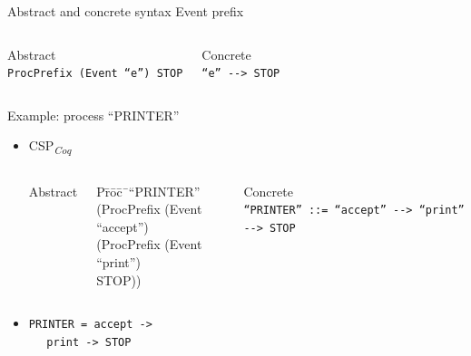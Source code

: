 \documentclass[t]{beamer}
\newcommand{\CSPcoq}{CSP\textsubscript{\textit{Coq}}}
\begin{document}
\begin{frame}{Abstract and concrete syntax}
	Event prefix
	\vskip 0.1in
	\begin{columns}
		\centering\small
		Abstract\\
		\texttt{ProcPrefix (Event ``e'') STOP}

		\centering\small
		Concrete\\
		\texttt{``e'' -{}-> STOP}
	\end{columns}

	\vskip 0.25in
	Example: process ``PRINTER''
	\begin{itemize}
		\item \CSPcoq{}\\
		\vskip 0.1in
		\begin{columns}
			\column{0.5\textwidth}
			\centering\small
			Abstract\\
			\ttfamily
			\begin{tabbing}
				P\=r\=o\=c\=\ ``PRINTER''\\
				\>	(ProcPrefix (Event ``accept'')\\
				\>\>	(ProcPrefix (Event ``print'')\\
				\>\>\>		STOP))
			\end{tabbing}
			\normalfont

			\column{0.5\textwidth}
			\centering\small
			Concrete\\
			\texttt{``PRINTER'' ::= ``accept'' -{}-> ``print'' -{}-> STOP}
		\end{columns}
		\vspace{1mm}
		\item \CSPM{}
		\vskip 0.05in
		\texttt{PRINTER = accept ->\\ $\ \ \ \ $ print -> STOP}
	\end{itemize}
\end{frame}
\end{document}
